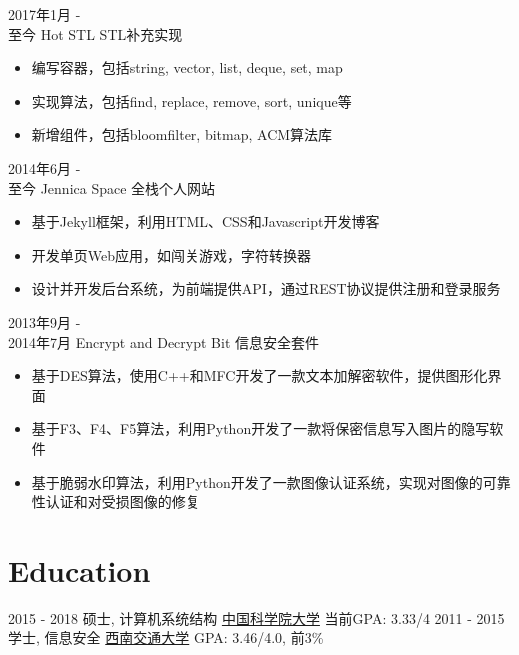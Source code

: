 \documentclass[letterpaper]{twentysecondcv} %
\begin{document}
\begin{twenty} %
	\twentyitem
	{2017年1月 - \\至今}
	{Hot STL}
	{STL补充实现}
	{}
	{
		{\begin{itemize}
				\item 编写容器，包括string, vector, list, deque, set, map
				\item 实现算法，包括find, replace, remove, sort, unique等
				\item 新增组件，包括bloomfilter, bitmap, ACM算法库
		\end{itemize}}
	}
	
	\twentyitem
	{2014年6月 - \\至今}
	{Jennica Space}
	{全栈个人网站}
	{}
	{
		{\begin{itemize}
				\item 基于Jekyll框架，利用HTML、CSS和Javascript开发博客
				\item 开发单页Web应用，如闯关游戏，字符转换器
				\item 设计并开发后台系统，为前端提供API，通过REST协议提供注册和登录服务
		\end{itemize}}
	}
	
	\twentyitem
	{2013年9月 - \\2014年7月}
	{Encrypt and Decrypt Bit}
	{信息安全套件}
	{}
	{
		{\begin{itemize}
				\item 基于DES算法，使用C++和MFC开发了一款文本加解密软件，提供图形化界面
				\item 基于F3、F4、F5算法，利用Python开发了一款将保密信息写入图片的隐写软件
				\item 基于脆弱水印算法，利用Python开发了一款图像认证系统，实现对图像的可靠性认证和对受损图像的修复
		\end{itemize}}
	}
	
\end{twenty}

\section{Education}

\begin{twenty} %
	\twentyitem
	{2015 - 2018}
	{硕士, 计算机系统结构}
	{\href{http://english.cas.cn/}{中国科学院大学}}
	{}
	{当前GPA: 3.33/4}
	\twentyitem
	{2011 - 2015}
	{学士, 信息安全}
	{\href{http://english.swjtu.edu.cn/}{西南交通大学}}
	{}
	{GPA: 3.46/4.0, 前3\%}
\end{twenty}
\end{document}
